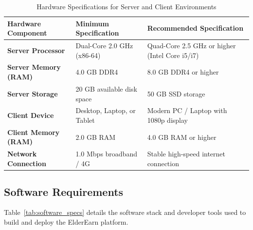 \documentclass[12pt,a4paper]{report}
\begin{document}
\begin{table}[H]
\centering
\small
\caption{Hardware Specifications for Server and Client Environments}
\label{tab:hardware_specs}
\begin{tabularx}{\textwidth}{|L{3.2cm}|L{4.2cm}|J|}
\hline
\textbf{Hardware Component} & \textbf{Minimum Specification} & \textbf{Recommended Specification} \\ \hline
\textbf{Server Processor} & Dual-Core 2.0 GHz (x86-64) & Quad-Core 2.5 GHz or higher (Intel Core i5/i7) \\ \hline
\textbf{Server Memory (RAM)} & 4.0 GB DDR4 & 8.0 GB DDR4 or higher \\ \hline
\textbf{Server Storage} & 20 GB available disk space & 50 GB SSD storage \\ \hline
\textbf{Client Device} & Desktop, Laptop, or Tablet & Modern PC / Laptop with 1080p display \\ \hline
\textbf{Client Memory (RAM)} & 2.0 GB RAM & 4.0 GB RAM or higher \\ \hline
\textbf{Network Connection} & 1.0 Mbps broadband / 4G & Stable high-speed internet connection \\ \hline
\end{tabularx}
\end{table}

\subsection{Software Requirements}
Table~\ref{tab:software_specs} details the software stack and developer tools used to build and deploy the ElderEarn platform.
\end{document}
